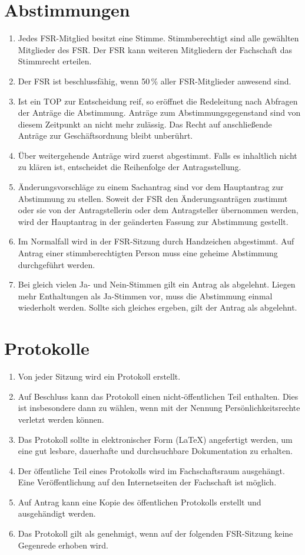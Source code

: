 \documentclass[
	a4paper,
	12pt,
	oneside,
	parskip=half-,
	pagesize,
	headsepline,
	german,
	ngerman
]{scrartcl}
\begin{document}
\section{Abstimmungen}
\label{sec:Abstimmungen}
\begin{enumerate}
	\item Jedes FSR-Mitglied besitzt eine Stimme. Stimmberechtigt sind alle gewählten Mitglieder des FSR. Der FSR kann weiteren Mitgliedern der Fachschaft das Stimmrecht erteilen.
	\item Der FSR ist beschlussfähig, wenn 50\,\% aller FSR-Mitglieder anwesend sind.
	\item Ist ein TOP zur Entscheidung reif, so eröffnet die Redeleitung nach Abfragen der Anträge die Abstimmung. Anträge zum Abstimmungsgegenstand sind von diesem Zeitpunkt an nicht mehr zulässig. Das Recht auf anschließende Anträge zur Geschäftsordnung bleibt unberührt.
	\item Über weitergehende Anträge wird zuerst abgestimmt. Falls es inhaltlich nicht zu klären ist, entscheidet die Reihenfolge der Antragsstellung.
	\item Änderungsvorschläge zu einem Sachantrag sind vor dem Hauptantrag zur Abstimmung zu stellen. Soweit der FSR den Änderungsanträgen zustimmt oder sie von der Antragstellerin oder dem Antragsteller übernommen werden, wird der Hauptantrag in der geänderten Fassung zur Abstimmung gestellt.
	\item Im Normalfall wird in der FSR-Sitzung durch Handzeichen abgestimmt. Auf Antrag einer stimmberechtigten Person muss eine geheime Abstimmung durchgeführt werden.
	\item Bei gleich vielen Ja- und Nein-Stimmen gilt ein Antrag als abgelehnt. Liegen mehr Enthaltungen als Ja-Stimmen vor, muss die Abstimmung einmal wiederholt werden. Sollte sich gleiches ergeben, gilt der Antrag als abgelehnt.
\end{enumerate}

\section{Protokolle}
\label{sec:Protokolle}
\begin{enumerate}
	\item Von jeder Sitzung wird ein Protokoll erstellt.
	\item Auf Beschluss kann das Protokoll einen nicht-öffentlichen Teil enthalten. Dies ist insbesondere dann zu wählen, wenn mit der Nennung Persönlichkeitsrechte verletzt werden können.
	\item Das Protokoll sollte in elektronischer Form (\LaTeX) angefertigt werden, um eine gut lesbare, dauerhafte und durchsuchbare Dokumentation zu erhalten.
	\item Der öffentliche Teil eines Protokolls wird im Fachschaftsraum ausgehängt. Eine Veröffentlichung auf den Internetseiten der Fachschaft ist möglich.
	\item Auf Antrag kann eine Kopie des öffentlichen Protokolls erstellt und ausgehändigt werden.
	\item Das Protokoll gilt als genehmigt, wenn auf der folgenden FSR-Sitzung keine Gegenrede erhoben wird.
\end{enumerate}
\end{document}
